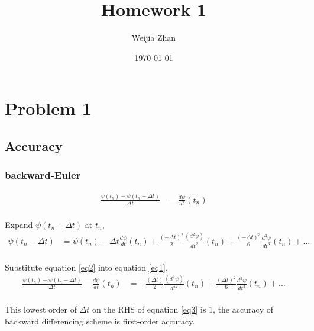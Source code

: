 \documentclass[12pt]{article}%
\begin{document}
\title{Homework 1}
\author{Weijia Zhan}
\date{\today}
\maketitle

\section{Problem 1}
\subsection{Accuracy}
\subsubsection{backward-Euler}
\begin{equation} \label{eq1}
\begin{split}
\frac{\psi(t_{n}) - \psi(t_{n} - \Delta t)}{\Delta t}  & = \frac{d\psi}{dt}(t_{n}) \\
\end{split}
\end{equation}



Expand $\psi(t_{n} - \Delta t)$ at $t_{n}$,
\begin{equation} \label{eq2}
\begin{split}
\psi(t_{n} - \Delta t) & = \psi(t_{n}) - \Delta t\frac{d\psi}{dt}(t_{n}) + \frac{(-\Delta t)^{2}}{2}\frac{(d^{2}\psi)}{dt^{2}}(t_{n}) + \frac{(-\Delta t)^{3}}{6}\frac{d^{3}\psi}{dt^{3}}(t_{n})  + ... \\
\end{split}
\end{equation}

Substitute equation \ref{eq2} into equation \ref{eq1},
\begin{equation} \label{eq3}
\begin{split}
\frac{\psi(t_{n}) - \psi(t_{n} - \Delta t)}{\Delta t}  - \frac{d\psi}{dt}(t_{n}) &= -\frac{(\Delta t)}{2}\frac{(d^{2}\psi)}{dt^{2}}(t_{n}) + \frac{(\Delta t)^{2}}{6}\frac{d^{3}\psi}{dt^{3}}(t_{n})  + ... \\
\end{split}
\end{equation}

This lowest order of $\Delta t$ on the RHS of equation \ref{eq3} is 1, the accuracy of backward differencing scheme is first-order accuracy.
\end{document}
